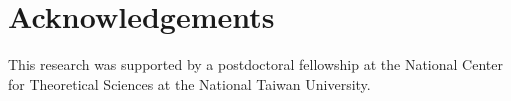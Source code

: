 \section*{Acknowledgements}
This research was supported by a postdoctoral fellowship at the National Center for Theoretical Sciences at the National Taiwan University. 